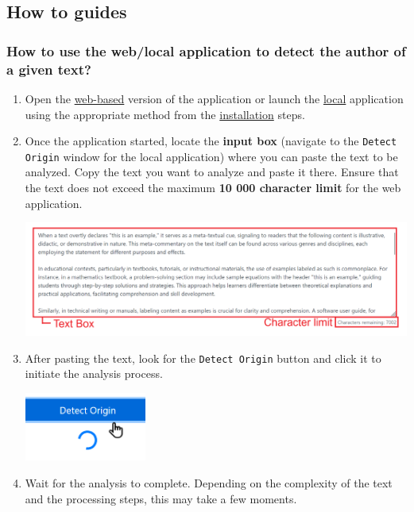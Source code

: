 \subsection{How to guides}
\subsubsection{How to use the web/local application to detect the author of a given text?}
\begin{enumerate}
    \item Open the \hyperref[subsubsec:Web application]{web-based} version of the application or launch the \hyperref[subsubsec:Local application]{local} application using the appropriate method from the \hyperref[subsec:First steps]{installation} steps.
    
    \item Once the application started, locate the \textbf{input box} (navigate to the \texttt{Detect Origin} window for the local application) where you can paste the text to be analyzed. Copy the text you want to analyze and paste it there. Ensure that the text does not exceed the maximum \textbf{10 000 character limit} for the web application. 
    \begin{center}
        \includegraphics[width=17cm]{Images/Usage/Demo/Paste-limit.png}
    \end{center}
    \item After pasting the text, look for the \texttt{Detect Origin} button and click it to initiate the analysis process.
    \begin{center}
        \includegraphics[width=4cm]{Images/Usage/Demo/Detect-load.png}
    \end{center}
    \item Wait for the analysis to complete. Depending on the complexity of the text and the processing steps, this may take a few moments.

\end{enumerate}
